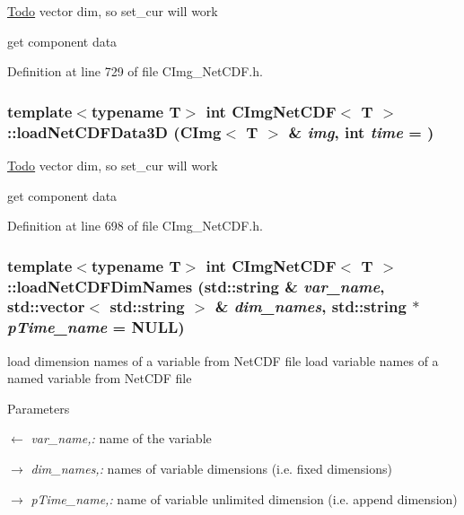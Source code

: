 \begin{Desc}
\item[\hyperlink{todo__todo000003}{Todo}]vector dim, so set\_\-cur will work \end{Desc}


get component data 

Definition at line 729 of file CImg\_\-NetCDF.h.\hypertarget{classCImgNetCDF_aa573424ddff780eeaa637ff276593ac2}{
\subsubsection[{loadNetCDFData3D}]{\setlength{\rightskip}{0pt plus 5cm}template$<$typename T$>$ int {\bf CImgNetCDF}$<$ T $>$::loadNetCDFData3D (CImg$<$ T $>$ \& {\em img}, \/  int {\em time} = {})}}
\label{classCImgNetCDF_aa573424ddff780eeaa637ff276593ac2}


\begin{Desc}
\item[\hyperlink{todo__todo000002}{Todo}]vector dim, so set\_\-cur will work \end{Desc}


get component data 

Definition at line 698 of file CImg\_\-NetCDF.h.\hypertarget{classCImgNetCDF_a350b9626b09d65e530c08ae5dea60484}{
\subsubsection[{loadNetCDFDimNames}]{\setlength{\rightskip}{0pt plus 5cm}template$<$typename T$>$ int {\bf CImgNetCDF}$<$ T $>$::loadNetCDFDimNames (std::string \& {\em var\_\-name}, \/  std::vector$<$ std::string $>$ \& {\em dim\_\-names}, \/  std::string $\ast$ {\em pTime\_\-name} = {\ttfamily NULL})}}
\label{classCImgNetCDF_a350b9626b09d65e530c08ae5dea60484}


load dimension names of a variable from NetCDF file load variable names of a named variable from NetCDF file


\begin{DoxyParams}{Parameters}
\item[\mbox{$\leftarrow$} {\em var\_\-name,:}]name of the variable \item[\mbox{$\rightarrow$} {\em dim\_\-names,:}]names of variable dimensions (i.e. fixed dimensions) \item[\mbox{$\rightarrow$} {\em pTime\_\-name,:}]name of variable unlimited dimension (i.e. append dimension)\end{DoxyParams}

